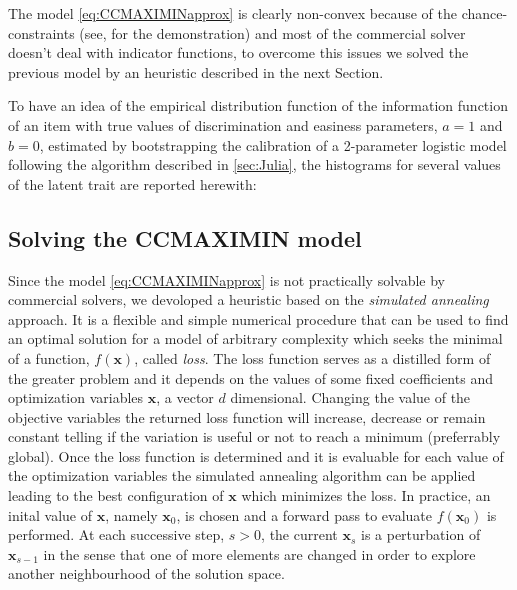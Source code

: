 The model \eqref{eq:CCMAXIMINapprox} is clearly non-convex because of the chance-constraints (see, \textcite{rockafellar2000optimization,rockafellar2001uryasev} for the demonstration) and most of the commercial solver doesn't deal with indicator functions, to overcome this issues we solved the previous model by an heuristic described in the next Section.

To have an idea of the empirical distribution function of the information function of an item with true values of discrimination and easiness parameters, $a=1$ and $b=0$, estimated by bootstrapping the calibration of a 2-parameter logistic model following the algorithm described in \ref{sec:Julia}, the histograms for several values of the latent trait are reported herewith:

 


\color{black}
\subsection{Solving the CCMAXIMIN model}

Since the model \eqref{eq:CCMAXIMINapprox} is not practically solvable by commercial solvers, we devoloped a heuristic based on the \emph{simulated annealing} approach.
It is a flexible and simple numerical procedure that can be used to find an optimal solution for a model of arbitrary complexity which seeks the minimal of a function, $f(\mathbf{x})$, called \emph{loss}. The loss function serves as a distilled form of the greater problem and it depends on the values of some fixed coefficients and optimization variables $\mathbf{x}$, a vector $d$ dimensional. Changing the value of the objective variables the returned loss function will increase, decrease or remain constant telling if the variation is useful or not to reach a minimum (preferrably global). Once the loss function is determined and it is evaluable for each value of the optimization variables the simulated annealing algorithm can be applied leading to the best configuration of $\mathbf{x}$ which minimizes the loss. In practice, an inital value of $\mathbf{x}$, namely $\mathbf{x}_0$, is chosen and a forward pass to evaluate $f(\mathbf{x}_0)$ is performed. At each successive step, $s>0$, the current $\mathbf{x}_s$ is a perturbation of $\mathbf{x}_{s-1}$ in the sense that one of more elements are changed in order to explore another neighbourhood of the solution space.

